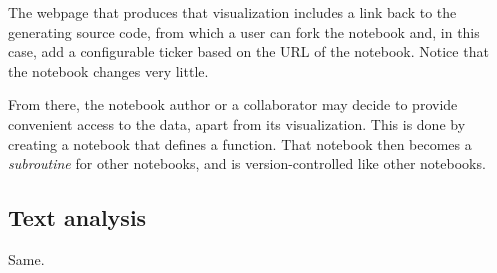 The webpage that produces that visualization includes a link back to
the generating source code, from which a user can fork the notebook
and, in this case, add a configurable ticker based on the URL of
the notebook. Notice that the notebook changes very little.

From there, the notebook author or a collaborator may decide to
provide convenient access to the data, apart from its visualization.
This is done by creating a notebook that defines a function.
That notebook then becomes a \emph{subroutine} for other notebooks,
and is version-controlled like other notebooks.







\subsection{Text analysis\label{sec:textvis}}

Same.

%
